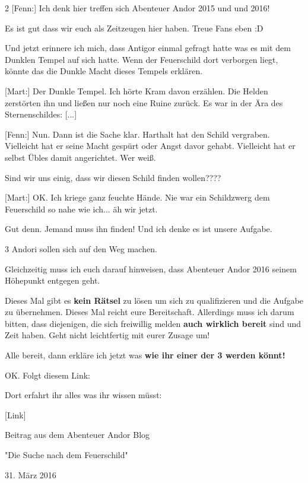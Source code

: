 \documentclass[10pt, a4paper, oneside]{book}
\begin{document}
\begin{multicols}{2}
[Fenn:] Ich denk hier treffen sich Abenteuer Andor 2015 und und 2016!

Es ist gut dass wir euch als Zeitzeugen hier haben. Treue Fans eben :D

Und jetzt erinnere ich mich, dass Antigor einmal gefragt hatte was es mit dem Dunklen Tempel auf sich hatte. Wenn der Feuerschild dort verborgen liegt, könnte das die Dunkle Macht dieses Tempels erklären.

[Mart:] Der Dunkle Tempel. Ich hörte Kram davon erzählen. Die Helden zerstörten ihn und ließen nur noch eine Ruine zurück. Es war in der Ära des Sternenschildes: [...]

[Fenn:] Nun. Dann ist die Sache klar. Harthalt hat den Schild vergraben. Vielleicht hat er seine Macht gespürt oder Angst davor gehabt. Vielleicht hat er selbst Übles damit angerichtet. Wer weiß.

Sind wir uns einig, dass wir diesen Schild finden wollen????

[Mart:] OK. Ich kriege ganz feuchte Hände. Nie war ein Schildzwerg dem Feuerschild so nahe wie ich... äh wir jetzt.

Gut denn. Jemand muss ihn finden! Und ich denke es ist unsere Aufgabe.

3 Andori sollen sich auf den Weg machen.

Gleichzeitig muss ich euch darauf hinweisen, dass Abenteuer Andor 2016 seinem Höhepunkt entgegen geht.

Dieses Mal gibt es \textbf{kein Rätsel} zu lösen um sich zu qualifizieren und die Aufgabe zu übernehmen. Dieses Mal reicht eure Bereitschaft. Allerdings muss ich darum bitten, dass diejenigen, die sich freiwillig melden \textbf{auch wirklich bereit} sind und Zeit haben. Geht nicht leichtfertig mit eurer Zusage um!

Alle bereit, dann erkläre ich jetzt was \textbf{wie ihr einer der 3 werden könnt!}

OK. Folgt diesem Link:

Dort erfahrt ihr alles was ihr wissen müsst:

[Link]





\begin{center}
    Beitrag aus dem Abenteuer Andor Blog

    "Die Suche nach dem Feuerschild"

    31. März 2016
\end{center}


\end{multicols}
\end{document}
